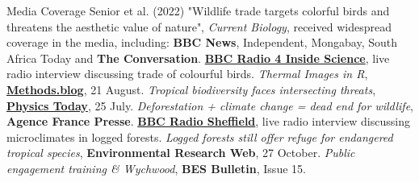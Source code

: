 \begin{rubric}{Media Coverage}
\entry*[2022] Senior et al. (2022) "Wildlife trade targets colorful birds and threatens the aesthetic value of nature", \emph{Current Biology}, received widespread coverage in the media, including: \textbf{BBC News}, Independent, Mongabay, South Africa Today and \textbf{The Conversation}.
\entry*[2022] \textbf{\href{https://www.bbc.co.uk/programmes/m001bz82}{BBC Radio 4 Inside Science}}, live radio interview discussing trade of colourful birds. 
\entry*[2019] \emph{Thermal Images in R}, \textbf{\href{https://methodsblog.com/2019/08/21/thermal-images-r/}{Methods.blog}}, 21 August. 
\entry*[2019] \emph{Tropical biodiversity faces intersecting threats}, \textbf{\href{https://physicstoday.scitation.org/do/10.1063/PT.6.1.20190725a/full/}{Physics Today}}, 25 July. 
\entry*[2019] \emph{Deforestation + climate change = dead end for wildlife}, \textbf{Agence France Presse}. 
\entry*[2017] \textbf{\href{https://acce.shef.ac.uk/good-news-for-a-change-acce-student-rebecca-seniors-interview-for-bbc/}{BBC Radio Sheffield}}, live radio interview discussing microclimates in logged forests. 
\entry*[2017] \emph{Logged forests still offer refuge for endangered tropical species}, \textbf{Environmental Research Web}, 27 October.
\entry*[2016] \emph{Public engagement training \& Wychwood}, \textbf{BES Bulletin}, Issue 15.
\end{rubric}